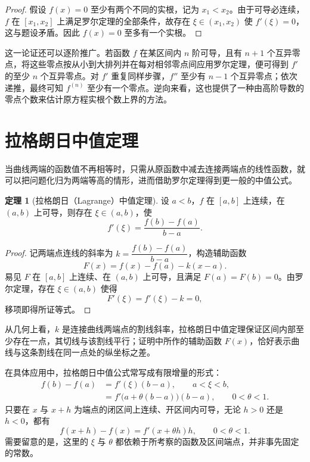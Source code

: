 \documentclass[UTF8,fontset=fandol,a4paper,12pt]{ctexart}
\theoremstyle{definition}
\newtheorem{theorem}{定理}[section]
\begin{document}
\begin{proof}
假设 $f(x)=0$ 至少有两个不同的实根，记为 $x_1<x_2$。由于可导必连续，$f$ 在 $[x_1,x_2]$ 上满足罗尔定理的全部条件，故存在 $\xi\in(x_1,x_2)$ 使 $f'(\xi)=0$，这与题设矛盾。因此 $f(x)=0$ 至多有一个实根。
\end{proof}

这一论证还可以逐阶推广。若函数 $f$ 在某区间内 $n$ 阶可导，且有 $n+1$ 个互异零点，将这些零点按从小到大排列并在每对相邻零点间应用罗尔定理，便可得到 $f'$ 的至少 $n$ 个互异零点。对 $f'$ 重复同样步骤，$f''$ 至少有 $n-1$ 个互异零点；依次递推，最终可知 $f^{(n)}$ 至少有一个零点。逆向来看，这也提供了一种由高阶导数的零点个数来估计原方程实根个数上界的方法。

\section{拉格朗日中值定理}
当曲线两端的函数值不再相等时，只需从原函数中减去连接两端点的线性函数，就可以把问题化归为两端等高的情形，进而借助罗尔定理得到更一般的中值公式。

\begin{theorem}[拉格朗日（Lagrange）中值定理]
设 $a<b$，$f$ 在 $[a,b]$ 上连续，在 $(a,b)$ 上可导，则存在 $\xi\in(a,b)$，使
\[
 \boxed{f'(\xi)=\frac{f(b)-f(a)}{b-a}.}
\]
\end{theorem}

\begin{proof}
记两端点连线的斜率为 $k=\dfrac{f(b)-f(a)}{b-a}$，构造辅助函数
\[
 F(x)=f(x)-f(a)-k(x-a).
\]
易见 $F$ 在 $[a,b]$ 上连续、在 $(a,b)$ 上可导，且满足 $F(a)=F(b)=0$。由罗尔定理，存在 $\xi\in(a,b)$ 使得
\[
 F'(\xi)=f'(\xi)-k=0,
\]
移项即得所证等式。
\end{proof}

从几何上看，$k$ 是连接曲线两端点的割线斜率，拉格朗日中值定理保证区间内部至少存在一点，其切线与该割线平行；证明中所作的辅助函数 $F(x)$，恰好表示曲线与这条割线在同一点处的纵坐标之差。

在具体应用中，拉格朗日中值公式常写成有限增量的形式：
\begin{align*}
 f(b)-f(a)&=f'(\xi)(b-a),\qquad a<\xi<b,\\
 &=f'\bigl(a+\theta(b-a)\bigr)(b-a),\qquad 0<\theta<1.
\end{align*}
只要在 $x$ 与 $x+h$ 为端点的闭区间上连续、开区间内可导，无论 $h>0$ 还是 $h<0$，都有
\[
 \boxed{f(x+h)-f(x)=f'(x+\theta h)h,\qquad 0<\theta<1.}
\]
需要留意的是，这里的 $\xi$ 与 $\theta$ 都依赖于所考察的函数及区间端点，并非事先固定的常数。
\end{document}
